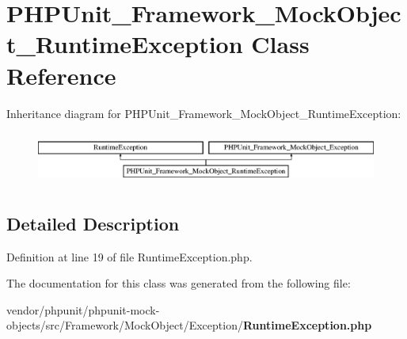 \section{P\+H\+P\+Unit\+\_\+\+Framework\+\_\+\+Mock\+Object\+\_\+\+Runtime\+Exception Class Reference}
\label{class_p_h_p_unit___framework___mock_object___runtime_exception}
Inheritance diagram for P\+H\+P\+Unit\+\_\+\+Framework\+\_\+\+Mock\+Object\+\_\+\+Runtime\+Exception\+:\begin{figure}[H]
\begin{center}
\leavevmode
\includegraphics[height=1.766562cm]{class_p_h_p_unit___framework___mock_object___runtime_exception}
\end{center}
\end{figure}


\subsection{Detailed Description}


Definition at line 19 of file Runtime\+Exception.\+php.



The documentation for this class was generated from the following file\+:\begin{DoxyCompactItemize}
\item 
vendor/phpunit/phpunit-\/mock-\/objects/src/\+Framework/\+Mock\+Object/\+Exception/{\bf Runtime\+Exception.\+php}\end{DoxyCompactItemize}
